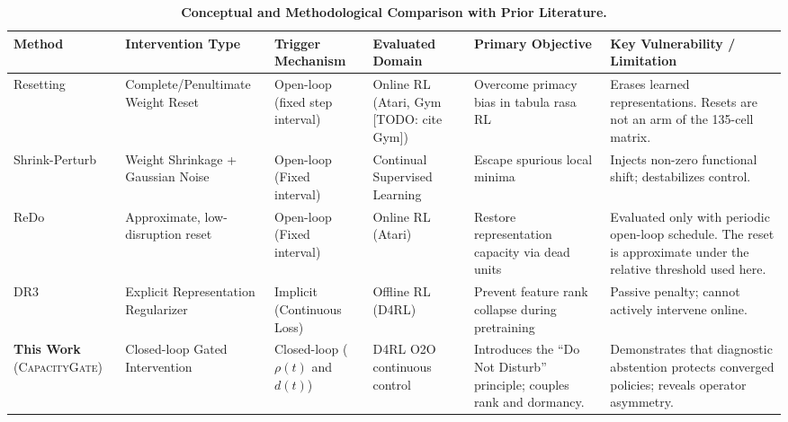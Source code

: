 \documentclass{article}
\begin{document}
\begin{table}[h]
\caption{\textbf{Conceptual and Methodological Comparison with Prior Literature.}}
\label{tab:lit_comparison}
\centering
\scriptsize
\begin{tabular}{p{}p{}p{}p{}p{}p{}}
\toprule
\textbf{Method} & \textbf{Intervention Type} & \textbf{Trigger Mechanism} & \textbf{Evaluated Domain} & \textbf{Primary Objective} & \textbf{Key Vulnerability / Limitation} \\
\midrule
Resetting \newline \citep{nikishin2022primacy} & Complete/Penultimate Weight Reset & Open-loop \newline (fixed step interval) & Online RL (Atari, Gym [TODO: cite Gym]) & Overcome primacy bias in tabula rasa RL & Erases learned representations. Resets are not an arm of the 135-cell matrix. \\
\midrule
Shrink-Perturb \newline \citep{ash2020warmstarting} & Weight Shrinkage + Gaussian Noise & Open-loop \newline (Fixed interval) & Continual Supervised Learning & Escape spurious local minima & Injects non-zero functional shift; destabilizes control. \\
\midrule
ReDo \newline \citep{sokar2023dormant} & Approximate, low-disruption reset & Open-loop \newline (Fixed interval) & Online RL (Atari) & Restore representation capacity via dead units & Evaluated only with periodic open-loop schedule. The reset is approximate under the relative threshold used here. \\
\midrule
DR3 \newline \citep{kumar2022dr3} & Explicit Representation Regularizer & Implicit \newline (Continuous Loss) & Offline RL (D4RL) & Prevent feature rank collapse during pretraining & Passive penalty; cannot actively intervene online. \\
\midrule
\textbf{This Work} \newline (\textsc{CapacityGate}) & Closed-loop Gated Intervention & Closed-loop \newline ($\rho(t)$ and $d(t)$) & D4RL O2O continuous control & Introduces the ``Do Not Disturb'' principle; couples rank and dormancy. & Demonstrates that diagnostic abstention protects converged policies; reveals operator asymmetry. \\
\bottomrule
\end{tabular}
\end{table}
\end{document}
